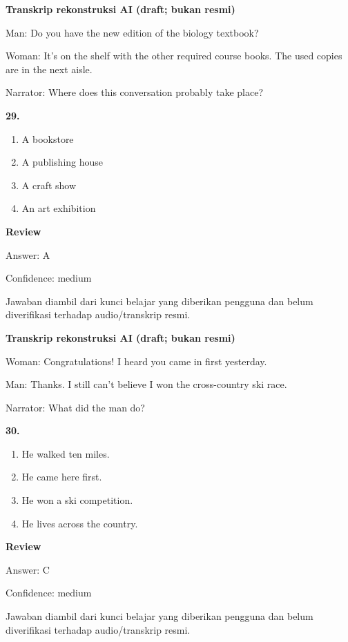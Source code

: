 \documentclass[12pt]{article}
\begin{document}
\vspace{0.25\baselineskip}
\begin{exampleblock}
\textbf{Transkrip rekonstruksi AI (draft; bukan resmi)}\par
Man: Do you have the new edition of the biology textbook?\par
Woman: It's on the shelf with the other required course books. The used copies are in the next aisle.\par
Narrator: Where does this conversation probably take place?\par
\end{exampleblock}
\noindent\textbf{29.}
\begin{enumerate}[label=(\Alph*),leftmargin=*,itemsep=0.2em]
\item A bookstore
\item A publishing house
\item A craft show
\item An art exhibition
\end{enumerate}
\par
\begingroup
\setlength{\parskip}{0pt}
\setlength{\parindent}{0pt}
\textbf{Review}\par
Answer: A\par
Confidence: medium\par
Jawaban diambil dari kunci belajar yang diberikan pengguna dan belum diverifikasi terhadap audio/transkrip resmi.\par
\endgroup
\par
\vspace{0.25\baselineskip}
\begin{exampleblock}
\textbf{Transkrip rekonstruksi AI (draft; bukan resmi)}\par
Woman: Congratulations! I heard you came in first yesterday.\par
Man: Thanks. I still can't believe I won the cross-country ski race.\par
Narrator: What did the man do?\par
\end{exampleblock}
\noindent\textbf{30.}
\begin{enumerate}[label=(\Alph*),leftmargin=*,itemsep=0.2em]
\item He walked ten miles.
\item He came here first.
\item He won a ski competition.
\item He lives across the country.
\end{enumerate}
\par
\begingroup
\setlength{\parskip}{0pt}
\setlength{\parindent}{0pt}
\textbf{Review}\par
Answer: C\par
Confidence: medium\par
Jawaban diambil dari kunci belajar yang diberikan pengguna dan belum diverifikasi terhadap audio/transkrip resmi.\par
\endgroup
\par
\vspace{0.25\baselineskip}
\end{document}
